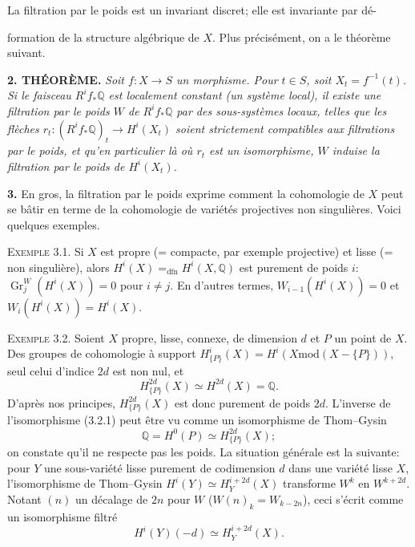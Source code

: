 \documentclass[8pt]{extarticle}
\newcommand{\DSourceFolio}{--}
\newcommand{\DAuthorityPage}{--}
\newcommand{\SourcePage}[2]{%
  \renewcommand{\DSourceFolio}{#1}%
  \renewcommand{\DAuthorityPage}{#2}%
  \thispagestyle{dpage}%
}
\newcommand{\EndSourcePage}{\clearpage}
\newcommand{\ReaderFont}{\fontsize{7.35}{8.15}\selectfont}
\newcommand{\NumPara}[1]{\par\noindent\textbf{#1}\enspace}
\newcommand{\NamedPara}[1]{\par\noindent\textsc{#1}\enspace}
\newcommand{\TheoremPara}[1]{\par\noindent\textbf{#1}\enspace\itshape}
\newcommand{\EndTheorem}{\par\normalfont}
\newcommand{\Q}{\mathbb{Q}}
\newcommand{\Gr}{\operatorname{Gr}}
\begin{document}
La filtration par le poids est un invariant discret; elle est invariante par dé-

\vfill
{}
\EndSourcePage

\SourcePage{80}{2}
\ReaderFont
formation de la structure algébrique de \(X\). Plus précisément, on a le théorème suivant.

\TheoremPara{2. THÉORÈME.} Soit \(f:X\to S\) un morphisme. Pour \(t\in S\), soit \(X_t=f^{-1}(t)\). Si le faisceau \(R^if_*\Q\) est localement constant (un système local), il existe une filtration par le poids \(W\) de \(R^if_*\Q\) par des sous-systèmes locaux, telles que les flèches \(r_t:(R^if_*\Q)_t\to H^i(X_t)\) soient strictement compatibles aux filtrations par le poids, et qu'en particulier là où \(r_t\) est un isomorphisme, \(W\) induise la filtration par le poids de \(H^i(X_t)\).\EndTheorem

\NumPara{3.} En gros, la filtration par le poids exprime comment la cohomologie de \(X\) peut se bâtir en terme de la cohomologie de variétés projectives non singulières. Voici quelques exemples.

\NamedPara{Exemple 3.1.} Si \(X\) est propre (= compacte, par exemple projective) et lisse (= non singulière), alors \(H^i(X)=_{\mathrm{dfn}}H^i(X,\Q)\) est purement de poids \(i\): \(\Gr_j^W(H^i(X))=0\) pour \(i\ne j\). En d'autres termes, \(W_{i-1}(H^i(X))=0\) et \(W_i(H^i(X))=H^i(X)\).

\NamedPara{Exemple 3.2.} Soient \(X\) propre, lisse, connexe, de dimension \(d\) et \(P\) un point de \(X\). Des groupes de cohomologie à support \(H^i_{\{P\}}(X)=H^i(X\mathbin{\mathrm{mod}}(X-\{P\}))\), seul celui d'indice \(2d\) est non nul, et
\begin{equation}\tag{3.2.1}
H^{2d}_{\{P\}}(X)\simeq H^{2d}(X)=\Q.
\end{equation}
D'après nos principes, \(H^{2d}_{\{P\}}(X)\) est donc purement de poids \(2d\). L'inverse de l'isomorphisme (3.2.1) peut être vu comme un isomorphisme de Thom--Gysin
\[
\Q=H^0(P)\simeq H^{2d}_{\{P\}}(X);
\]
on constate qu'il ne respecte pas les poids. La situation générale est la suivante: pour \(Y\) une sous-variété lisse purement de codimension \(d\) dans une variété lisse \(X\), l'isomorphisme de Thom--Gysin \(H^i(Y)\simeq H_Y^{i+2d}(X)\) transforme \(W^k\) en \(W^{k+2d}\). Notant \((n)\) un décalage de \(2n\) pour \(W\) (\(W(n)_k=W_{k-2n}\)), ceci s'écrit comme un isomorphisme filtré
\[
H^i(Y)(-d)\simeq H_Y^{i+2d}(X).
\]
\end{document}
